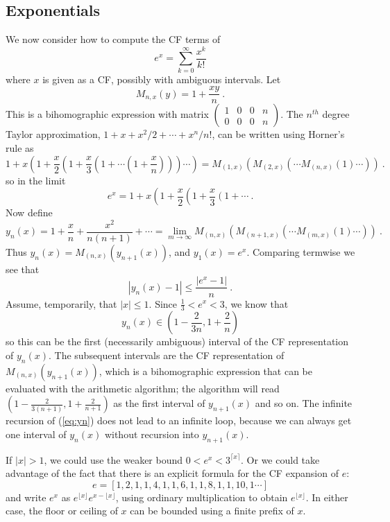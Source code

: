 \documentclass[11pt, oneside]{amsart}   	%
\newcommand{\bihomographic}[8]{\left(\begin{smallmatrix}#1&#2&#3&#4\\#5&#6&#7&#8\end{smallmatrix}\right)}
\renewcommand{\:}{\negthickspace:\negthickspace}
\begin{document}
\subsection{Exponentials} We now consider how to compute the CF terms of 
\[
e^x = \sum_{k=0}^{\infty} \frac{x^k}{k!}
\]
where $x$ is given as a CF, possibly with ambiguous intervals. Let
\[
M_{n,x}(y) = 1 + \frac{xy}{n} \ .
\]
This is a bihomographic expression with matrix $\bihomographic{1}{0}{0}{n}{0}{0}{0}{n}$. The $n^{th}$ degree Taylor approximation,
$1 + x + x^2/2 +\cdots + x^n/{n!}$, can be written using Horner's rule as
\[
 1 + x \left(1 + \frac{x}{2}\left( 1 + \frac{x}{3}\left(1 + \cdots \left(1 + \frac{x}{n}\right)\right)\right) \cdots \right) = M_{(1,x)}( M_{(2,x)}( \cdots M_{(n,x)}(1) \cdots ) ) \ .
 \]
 so in the limit
 \begin{equation}\label{eq:spigot}
 e^x = 1 + x \left(1 + \frac{x}{2}\left( 1 + \frac{x}{3}\left(1 + \cdots \right. \right.  \right.   \ .
 \end{equation} 
 Now define
 \begin{equation}\label{eq:yn}
 y_n(x) = 1 + \frac{x}{n} + \frac{x^2}{n(n+1)} + \cdots = \lim_{m\to\infty} M_{(n,x)}( M_{(n+1,x)}( \cdots M_{(m,x)}(1) \cdots ) ) \ .
  \end{equation}
Thus $y_n(x) = M_{(n,x)}(y_{n+1}(x))$, and $y_1(x) = e^x$.
 Comparing termwise we see that
 \[
 |y_n(x) - 1| \leq \frac{|e^x - 1|}{n} \ .
 \]
 Assume, temporarily, that $|x| \leq 1$. Since $\frac{1}{3} < e^x < 3$, we know that 
 \[
 y_n(x) \in (1 - \frac{2}{3n}, 1 + \frac{2}{n})
 \]
 so this can be the first (necessarily ambiguous) interval of the CF representation of $y_n(x)$.
The subsequent intervals are the CF representation of $M_{(n,x)}(y_{n+1}(x))$,
which is a bihomographic expression that can be evaluated with the arithmetic algorithm;
the algorithm will read $(1 - \frac{2}{3(n+1)}, 1 + \frac{2}{n+1})$ as the first interval of $y_{n+1}(x)$ and so on. The infinite recursion of (\ref{eq:yn}) does not lead to an infinite loop, because we can always get one interval of $y_n(x)$ without recursion into $y_{n+1}(x)$.

If $|x|>1$, we could use the weaker bound $0 < e^x < 3^{\lceil x \rceil}$. Or we could take advantage of the fact that there is an explicit formula for the CF expansion of $e$:
\[
e = [1,2,1,1,4,1,1,6,1,1,8,1,1,10,1 \cdots ]
\]
and write $e^x$ as $e^{\lfloor x \rfloor}e^{x-\lfloor x \rfloor}$, using ordinary multiplication to obtain $e^{\lfloor x \rfloor}$. In either case, the floor or ceiling of $x$ can be bounded using a finite prefix of $x$.
\end{document}
